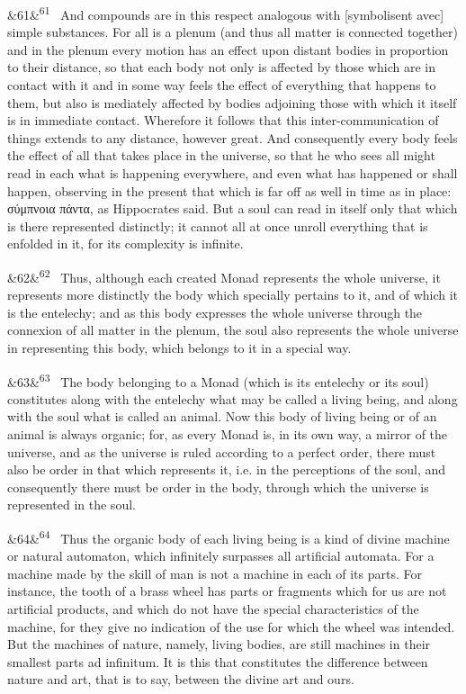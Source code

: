 \documentclass[12pt]{article}
\newcommand{\para}[1][]{\par\noindent\ifx&#1&\else\textsuperscript{\footnotesize #1}~\fi}
\begin{document}
\para[61] And compounds are in this respect analogous with [symbolisent avec] simple substances. For all is a plenum (and thus all matter is connected together) and in the plenum every motion has an effect upon distant bodies in proportion to their distance, so that each body not only is affected by those which are in contact with it and in some way feels the effect of everything that happens to them, but also is mediately affected by bodies adjoining those with which it itself is in immediate contact. Wherefore it follows that this inter-communication of things extends to any distance, however great. And consequently every body feels the effect of all that takes place in the universe, so that he who sees all might read in each what is happening everywhere, and even what has happened or shall happen, observing in the present that which is far off as well in time as in place: σύμπνοια πάντα, as Hippocrates said. But a soul can read in itself only that which is there represented distinctly; it cannot all at once unroll everything that is enfolded in it, for its complexity is infinite.

\para[62] Thus, although each created Monad represents the whole universe, it represents more distinctly the body which specially pertains to it, and of which it is the entelechy; and as this body expresses the whole universe through the connexion of all matter in the plenum, the soul also represents the whole universe in representing this body, which belongs to it in a special way.

\para[63] The body belonging to a Monad (which is its entelechy or its soul) constitutes along with the entelechy what may be called a living being, and along with the soul what is called an animal. Now this body of living being or of an animal is always organic; for, as every Monad is, in its own way, a mirror of the universe, and as the universe is ruled according to a perfect order, there must also be order in that which represents it, i.e. in the perceptions of the soul, and consequently there must be order in the body, through which the universe is represented in the soul.

\para[64] Thus the organic body of each living being is a kind of divine machine or natural automaton, which infinitely surpasses all artificial automata. For a machine made by the skill of man is not a machine in each of its parts. For instance, the tooth of a brass wheel has parts or fragments which for us are not artificial products, and which do not have the special characteristics of the machine, for they give no indication of the use for which the wheel was intended. But the machines of nature, namely, living bodies, are still machines in their smallest parts ad infinitum. It is this that constitutes the difference between nature and art, that is to say, between the divine art and ours.
\end{document}
